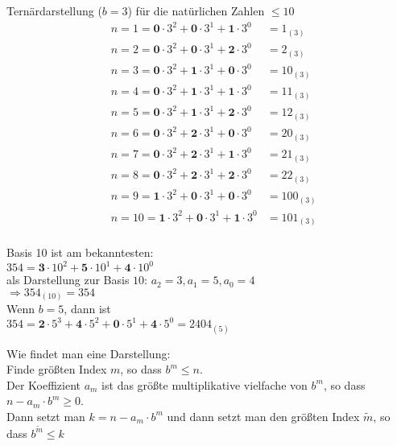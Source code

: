 \documentclass[../ana1u.tex]{subfiles}
\begin{document}
\begin{bsp}
    Ternärdarstellung (\(b = 3\)) für die natürlichen Zahlen \(\leq 10\)\\
    \begin{align*}
        &n = 1 = \textbf{0} \cdot 3^2 + \textbf{0} \cdot 3^1 + \textbf{1} \cdot 3^0 &= 1_{(3)}\\
        &n = 2 = \textbf{0} \cdot 3^2 + \textbf{0} \cdot 3^1 + \textbf{2} \cdot 3^0 &= 2_{(3)}\\
        &n = 3 = \textbf{0} \cdot 3^2 + \textbf{1} \cdot 3^1 + \textbf{0} \cdot 3^0 &= 10_{(3)}\\
        &n = 4 = \textbf{0} \cdot 3^2 + \textbf{1} \cdot 3^1 + \textbf{1} \cdot 3^0 &= 11_{(3)}\\
        &n = 5 = \textbf{0} \cdot 3^2 + \textbf{1} \cdot 3^1 + \textbf{2} \cdot 3^0 &= 12_{(3)}\\
        &n = 6 = \textbf{0} \cdot 3^2 + \textbf{2} \cdot 3^1 + \textbf{0} \cdot 3^0 &= 20_{(3)}\\
        &n = 7 = \textbf{0} \cdot 3^2 + \textbf{2} \cdot 3^1 + \textbf{1} \cdot 3^0 &= 21_{(3)}\\
        &n = 8 = \textbf{0} \cdot 3^2 + \textbf{2} \cdot 3^1 + \textbf{2} \cdot 3^0 &= 22_{(3)}\\
        &n = 9 = \textbf{1} \cdot 3^2 + \textbf{0} \cdot 3^1 + \textbf{0} \cdot 3^0 &= 100_{(3)}\\
        &n = 10 = \textbf{1} \cdot 3^2 + \textbf{0} \cdot 3^1 + \textbf{1} \cdot 3^0 &= 101_{(3)}\\
    \end{align*}
\end{bsp}
\begin{bsp}
    Basis 10 ist am bekanntesten:\\
    \(354 = \textbf{3} \cdot 10^2 + \textbf{5} \cdot 10^1 + \textbf{4} \cdot 10^0\)\\
    als Darstellung zur Basis \(10\): \(a_2 = 3, a_1 = 5, a_0 = 4\)\\
    \(\Rightarrow 354_{(10)} = 354\)\\
    Wenn \(b = 5\), dann ist\\
    \(354 = \textbf{2} \cdot 5^3 + \textbf{4} \cdot 5^2 + \textbf{0} \cdot 5^1 + \textbf{4} \cdot 5^0 = 2404_{(5)}\)
\end{bsp}
\begin{bem} %
    Wie findet man eine Darstellung:\\
    Finde größten Index \(m\), so dass \(b^m \leq n\).\\
    Der Koeffizient \(a_m\) ist das größte multiplikative vielfache von \(b^m\), so dass \(n - a_m \cdot b^m \geq 0\).\\
    Dann setzt man \(k=n-a_m \cdot b^m\) und dann setzt man den größten Index \(\tilde{m}\), so dass \(b^{\tilde{m}} \leq k\)
\end{bem}
\end{document}
